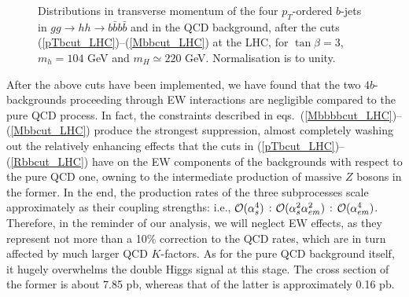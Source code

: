 \begin{figure}[!ht]
\begin{minipage}[b]{.495\linewidth}
\centering{}
\end{minipage}\hfill\hfill
\begin{minipage}[b]{.495\linewidth}
\centering{}
\end{minipage}\hfill\hfill
\begin{minipage}[b]{.495\linewidth}
\centering{}
\end{minipage}\hfill\hfill
\begin{minipage}[b]{.495\linewidth}
\centering{}
\end{minipage}

\caption{Distributions in transverse momentum of the
four $p_T$-ordered $b$-jets in $gg\to hh\to b\bar b b\bar b$ and
in the QCD background, after the cuts
(\ref{pTbcut_LHC})--(\ref{Mbbcut_LHC}) at the LHC, 
for $\tan\beta=3$, $m_h=104$ GeV and $m_H\simeq220$ GeV.
Normalisation is to unity.}
\vspace*{-3mm}
\label{fig:pTaftercuts_LHC}
\end{figure}

After the above cuts have been implemented, we have found that the two
$4b$-backgrounds proceeding through EW interactions are negligible
compared to the pure QCD process.  In fact, the constraints described
in eqs.~(\ref{Mbbbbcut_LHC})--(\ref{Mbbcut_LHC}) produce the strongest
suppression, almost completely washing out the relatively enhancing
effects that the cuts in (\ref{pTbcut_LHC})--(\ref{Rbbcut_LHC}) have
on the EW components of the backgrounds with respect to the pure QCD
one, owning to the intermediate production of massive $Z$ bosons in
the former. In the end, the production rates of the three subprocesses
scale approximately as their coupling strengths: i.e., ${\cal
  O}(\alpha_s^4)$ : ${\cal O}(\alpha_s^2\alpha_{em}^2)$ : ${\cal
  O}(\alpha_{em}^4)$. Therefore, in the reminder of our analysis, we
will neglect EW effects, as they represent not more than a 10\%
correction to the QCD rates, which are in turn affected by much larger
QCD $K$-factors.  As for the pure QCD background itself, it hugely
overwhelms the double Higgs signal at this stage.  The cross section
of the former is about 7.85 pb, whereas that of the latter is
approximately 0.16 pb.

